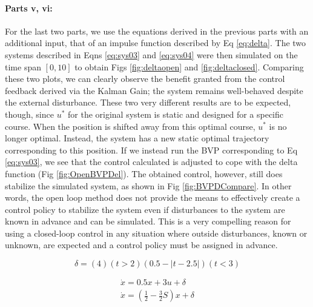 \documentclass[12pt, notitlepage, letterpaper]{article}
\begin{document}
\paragraph{Parts v, vi:}

For the last two parts, we use the equations derived in the previous parts with an additional input, that of an impulse function described by Eq \ref{eq:delta}.  The two systems described in Eqns \ref{eq:sys03} and \ref{eq:sys04} were then simulated on the time span $[0,10]$ to obtain Figs \ref{fig:deltaopen} and \ref{fig:deltaclosed}.  Comparing these two plots, we can clearly observe the benefit granted from the control feedback derived via the Kalman Gain; the system remains well-behaved despite the external disturbance.  These two very different results are to be expected, though, since $u^*$ for the original system is static and designed for a specific course.  When the position is shifted away from this optimal course, $u^*$ is no longer optimal.  Instead, the system has a new static optimal trajectory corresponding to this position.  If we instead run the BVP corresponding to Eq \ref{eq:sys03}, we see that the control calculated is adjusted to cope with the delta function (Fig \ref{fig:OpenBVPDel}).  The obtained control, however, still does stabilize the simulated system, as shown in Fig \ref{fig:BVPDCompare}.  In other words, the open loop method does not provide the means to effectively create a control policy to stabilize the system even if disturbances to the system are known in advance and can be simulated.  This is a very compelling reason for using a closed-loop control in any situation where outside disturbances, known or unknown, are expected and a control policy must be assigned in advance.

\begin{equation}
\label{eq:delta}
\delta = (4)(t>2)(0.5-|t-2.5|)(t<3)
\end{equation}

\begin{align}
\label{eq:sys03}
\dot{x} = 0.5x + 3u + \delta \\ 
\label{eq:sys04}
\dot{x} = (\frac{1}{2} - \frac{3}{2}S)x + \delta
\end{align}
\end{document}
